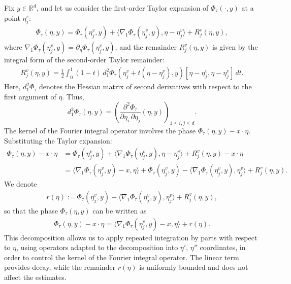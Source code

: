 \documentclass[12pt, reqno]{amsart}
\theoremstyle{definition}
\theoremstyle{remark}
\numberwithin{equation}{section}
\begin{document}
Fix $y \in \mathbb{R}^d$, and let us consider the first-order Taylor expansion of $\Phi_\tau(\cdot,y)$ at a point $\eta_j^v$:
\begin{align*}
    \Phi_\tau(\eta,y) 
    = \Phi_\tau(\eta_j^v, y) 
    + \langle \nabla_1 \Phi_\tau(\eta_j^v, y), \eta - \eta_j^v \rangle 
    + R_j^v(\eta,y),
\end{align*}
where $\nabla_1 \Phi_\tau(\eta_j^v,y) = \partial_\eta \Phi_\tau(\eta_j^v,y)$, and the remainder $R_j^v(\eta,y)$ is given by the integral form of the second-order Taylor remainder:
\begin{align*}
    R_j^v(\eta,y) = \frac12 \int_0^1 (1-t)\, d_1^2 \Phi_\tau(\eta_j^v + t(\eta-\eta_j^v), y)[\eta-\eta_j^v, \eta-\eta_j^v]\, dt.
\end{align*}
Here, $d_1^2 \Phi_\tau$ denotes the Hessian matrix of second derivatives with respect to the first argument of $\eta$. Thus, \[
d_1^2 \Phi_{\tau}(\eta,y)
= \left( \frac{\partial^2 \Phi_{\tau}}{\partial \eta_i\, \partial \eta_j}(\eta,y) \right)_{1 \le i,j \le d}.
\]
The kernel of the Fourier integral operator involves the phase $\Phi_\tau(\eta,y) - x\cdot \eta$. Substituting the Taylor expansion:
\begin{align*}
    \Phi_\tau(\eta,y) - x \cdot \eta 
    &= \Phi_\tau(\eta_j^v, y) + \langle \nabla_1 \Phi_\tau(\eta_j^v,y), \eta - \eta_j^v \rangle + R_j^v(\eta,y) - x \cdot \eta \\
    &= \langle \nabla_1 \Phi_\tau(\eta_j^v,y) - x, \eta \rangle 
    + \Phi_\tau(\eta_j^v,y) - \langle \nabla_1 \Phi_\tau(\eta_j^v,y), \eta_j^v \rangle + R_j^v(\eta,y).
\end{align*}
We denote
\begin{align*}
r(\eta) := \Phi_\tau(\eta_j^v,y) - \langle \nabla_1 \Phi_\tau(\eta_j^v,y), \eta_j^v \rangle + R_j^v(\eta,y),
\end{align*}
so that the phase $\Phi_\tau(\eta,y)$ can be written as
\begin{align*}
\Phi_\tau(\eta,y) - x\cdot \eta = \langle \nabla_1 \Phi_\tau(\eta_j^v,y) - x, \eta \rangle + r(\eta).
\end{align*}
This decomposition allows us to apply repeated integration by parts with respect to $\eta$, using operators adapted to the decomposition into $\eta'$, $\eta''$ coordinates, in order to control the kernel of the Fourier integral operator. The linear term provides decay, while the remainder $r(\eta)$ is uniformly bounded and does not affect the estimates.
\end{document}
